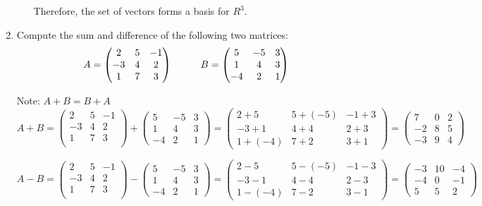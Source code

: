 \documentclass[fleqn]{article}
\begin{document}
\begin{enumerate}
\begin{itemize}
Therefore, the set of vectors forms a basis for $R^3$.
\end{itemize}


\item  Compute the sum and difference of the following two matrices:
$$A=\begin{pmatrix}
2 & 5 & -1 \\
-3 & 4 & 2 \\
1 & 7 & 3
\end{pmatrix} \hskip 1truecm B=\begin{pmatrix}
5 & -5 & 3 \\
1 & 4 & 3 \\
-4 & 2 & 1
\end{pmatrix}$$ 

Note: $A+B=B+A$
\\
\noindent
$A+B=
\begin{pmatrix}
    2 & 5 & -1 \\
    -3 & 4 & 2 \\ 
    1 & 7 & 3 \\ 
\end{pmatrix}
+
\begin{pmatrix}
  5 & -5 & 3 \\
  1 & 4 & 3 \\
  -4 & 2 & 1
\end{pmatrix}
=
\begin{pmatrix}
  2+5 & 5+(-5) & -1+3 \\
  -3+1 & 4+4 & 2+3 \\
  1+(-4) & 7+2 & 3+1
\end{pmatrix}
=
\begin{pmatrix}
  7 & 0 & 2 \\
  -2 & 8 & 5 \\
  -3 & 9 & 4
\end{pmatrix}
$

\noindent
$A-B=
\begin{pmatrix}
    2 & 5 & -1 \\
    -3 & 4 & 2 \\ 
    1 & 7 & 3 \\ 
\end{pmatrix}
-
\begin{pmatrix}
  5 & -5 & 3 \\
  1 & 4 & 3 \\
  -4 & 2 & 1
\end{pmatrix}
=
\begin{pmatrix}
  2-5 & 5-(-5) & -1-3 \\
  -3-1 & 4-4 & 2-3 \\
  1-(-4) & 7-2 & 3-1
\end{pmatrix}
=
\begin{pmatrix}
  -3 & 10 & -4 \\
  -4 & 0 & -1 \\
  5 & 5 & 2
\end{pmatrix}
$


\end{enumerate}
\end{document}

